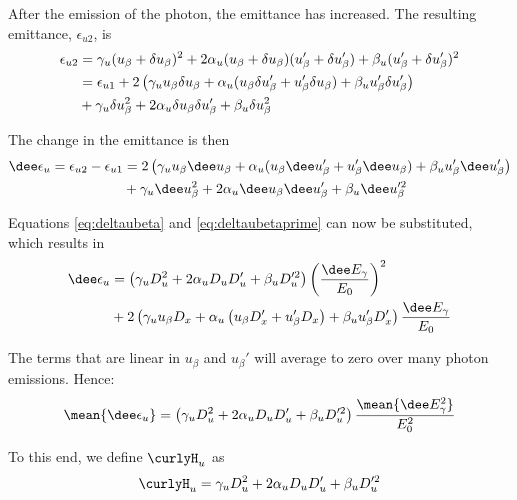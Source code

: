 After the emission of the photon, the emittance has increased. The resulting emittance, $\epsilon_{u2}$, is
\begin{align}
    \epsilon_{u2}   &= \gamma_u (u_\beta + \delta u_\beta)^2 + 2 \alpha_u (u_\beta + \delta u_\beta)(u_\beta' + \delta u_\beta') + \beta_u (u_\beta' + \delta u_\beta')^2 \notag\\
                    &= \epsilon_{u1} + 2 \left( \gamma_u u_\beta \delta u_\beta + \alpha_u (u_\beta \delta u_\beta' + u_\beta' \delta u_\beta) + \beta_u u_\beta' \delta u_\beta' \right)\notag \\
                    &+ \gamma_u \delta u_\beta^2 + 2 \alpha_u \delta u_\beta \delta u_\beta' + \beta_u \delta u_\beta^2
\end{align}

The change in the emittance is then
\begin{align}
    \dee \epsilon_u = \epsilon_{u2} - \epsilon_{u1} &= 2 \left( \gamma_u u_\beta \dee u_\beta + \alpha_u (u_\beta \dee u_\beta' + u_\beta' \dee u_\beta) + \beta_u u_\beta' \dee u_\beta' \right)\notag\\
                    &+ \gamma_u \dee u_\beta^2 + 2 \alpha_u \dee u_\beta \dee u_\beta' + \beta_u \dee u_\beta'^2
\end{align}

Equations \eqref{eq:deltaubeta} and \eqref{eq:deltaubetaprime} can now be substituted, which results in
\begin{align}
    \dee \epsilon_u &= \left( \gamma_u D_u^2 + 2 \alpha_u D_u D_u' + \beta_u D_u'^2 \right) \left( \frac{\dee E_\gamma}{E_0} \right)^2 \notag\\
                    &+ 2 \left( \gamma_u u_\beta D_x + \alpha_u \left( u_\beta D_x' + u_\beta' D_x \right) + \beta_u u_\beta'D_x' \right) \frac{\dee E_\gamma}{E_0}
\end{align}

The terms that are linear in $u_\beta$ and $u_\beta'$ will average to zero over many photon emissions. Hence:
\begin{equation}
    \mean{\dee \epsilon_u} = \left( \gamma_u D_u^2 + 2 \alpha_u D_u D_u' + \beta_u D_u'^2 \right) \frac{\mean{\dee E_\gamma^2}}{E_0^2}
\end{equation}

To this end, we define $\curlyH_u$ as
\begin{equation}
    \curlyH_u = \gamma_u D_u^2 + 2 \alpha_u D_u D_u' + \beta_u D_u'^2
\end{equation}

